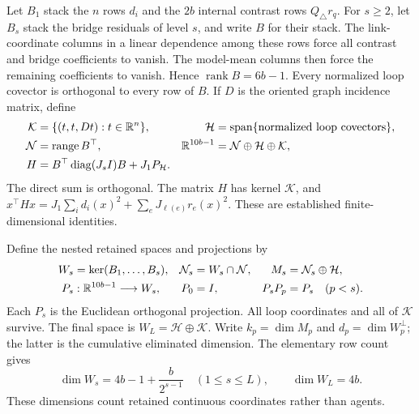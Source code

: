 Let \(B_1\) stack the \(n\) rows \(d_i\) and the \(2b\) internal
contrast rows \(Q_\triangle r_q\). For \(s\ge2\), let \(B_s\) stack
the bridge residuals of level \(s\), and write \(B\) for their stack.
The link-coordinate columns in a linear dependence among these rows force
all contrast and bridge coefficients to vanish. The model-mean columns
then force the remaining coefficients to vanish. Hence
\(\operatorname{rank}B=6b-1\). Every normalized loop covector is
orthogonal to every row of \(B\). If \(D\) is the oriented graph
incidence matrix, define
\begin{equation}
\begin{aligned}
\mathcal K&=\{(t,t,Dt):t\in\mathbb R^n\},&
\mathcal H&=\operatorname{span}\{\text{normalized loop covectors}\},\\
\mathcal N&=\operatorname{range}B^\top,&
\mathbb R^{10b-1}&=\mathcal N\oplus\mathcal H\oplus\mathcal K,\\
H&=B^\top\operatorname{diag}(J_sI)B+J_1P_{\mathcal H}.
\end{aligned}
\label{eq:rg-formation-orthogonal-split}
\end{equation}
The direct sum is orthogonal. The matrix \(H\) has kernel
\(\mathcal K\), and
\(x^\top Hx=J_1\sum_i d_i(x)^2+\sum_eJ_{\ell(e)}r_e(x)^2\).
These are established finite-dimensional identities.

Define the nested retained spaces and projections by
\begin{equation}
\begin{aligned}
W_s&=\ker(B_1,\ldots,B_s),&
\mathcal N_s&=W_s\cap\mathcal N,&
M_s&=\mathcal N_s\oplus\mathcal H,\\
P_s&:\mathbb R^{10b-1}\longrightarrow W_s,&
P_0&=I,&
P_sP_p&=P_s\quad(p<s).
\end{aligned}
\label{eq:rg-formation-projections}
\end{equation}
Each \(P_s\) is the Euclidean orthogonal projection. All loop coordinates
and all of \(\mathcal K\) survive. The final space is
\(W_L=\mathcal H\oplus\mathcal K\). Write \(k_p=\dim M_p\) and
\(d_p=\dim W_p^\perp\); the latter is the cumulative eliminated
dimension. The elementary row count gives
\begin{equation}
\dim W_s=4b-1+\frac{b}{2^{s-1}}\quad(1\le s\le L),
\qquad
\dim W_L=4b.
\label{eq:rg-formation-dimensions}
\end{equation}
These dimensions count retained continuous coordinates rather than
agents. 

